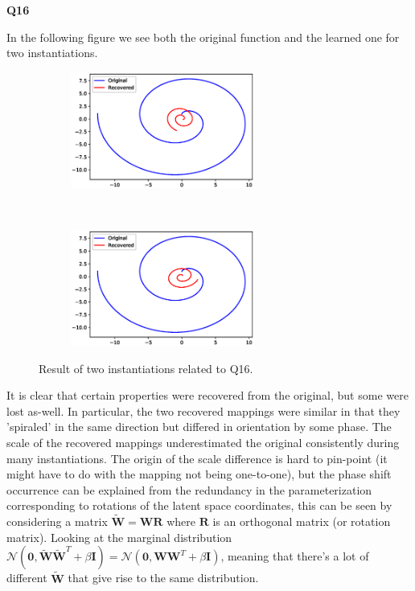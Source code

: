 \documentclass[a4paper]{article}
\begin{document}
\newpage
\noindent\textbf{Q16}

\noindent\makebox[\linewidth]{\rule{\textwidth}{0.4pt}}
\hfil

\noindent In the following figure we see both the original function and the learned one for two instantiations.  

\begin{figure}[h!]
	\centering
	\begin{subfigure}[t]{0.5\textwidth}
		\centering
		\includegraphics[height=1.5in]{representation.eps}
	\end{subfigure}%
	~ 
	\begin{subfigure}[t]{0.5\textwidth}
		\centering
		\includegraphics[height=1.5in]{representation2.eps}
	\end{subfigure}
\caption{Result of two instantiations related to Q16.}
\end{figure}

\noindent It is clear that certain properties were recovered from the original, but some were lost as-well. In particular, the two recovered mappings were similar in that they 'spiraled' in the same direction but differed in orientation by some phase. The scale of the recovered mappings underestimated the original consistently during many instantiations. The origin of the scale difference is hard to pin-point (it might have to do with the mapping not being one-to-one), but the phase shift occurrence can be explained from the redundancy in the parameterization corresponding to rotations of the latent space coordinates, this can be seen by considering a matrix $\tilde{\mathbf{W}}=\mathbf{WR}$ where $\mathbf{R}$ is an orthogonal matrix (or rotation matrix). Looking at the marginal distribution $\mathcal{N}(\mathbf{0},\mathbf{\tilde{\mathbf{W}}}\tilde{\mathbf{W}}^T+\beta\mathbf{I})=\mathcal{N}(\mathbf{0},\mathbf{\mathbf{W}}\mathbf{W}^T+\beta\mathbf{I})$, meaning that there's a lot of different $\tilde{\mathbf{W}}$ that give rise to the same distribution. 
\end{document}
